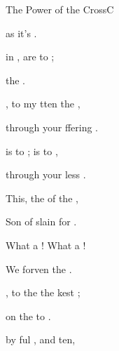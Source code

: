 \documentclass[12pt]{book}
\begin{document}
\begin{song}{The Power of the Cross}{C}
\begin{SBVerse}
         as it's 
              .

          in , 
             are  to ;

         the  .

    \end{SBVerse}

    \begin{SBVerse}
        
        , to  my  
            tten  the , 

         through your ffering 
              .

         is  to ;
             is  to ,

         through your less .

    \end{SBVerse}

    \begin{SBChorus}

        This, the  of the ,

        Son of  slain for .

        What a ! What a !

        We  forven  the . 
            \Ch{[Am}{}  \Ch{C]}{}

    \end{SBChorus}

\begin{SBExtraKeys}{
    \CBPageBrk

    \Ch{Intro: [Em}{}  \Ch{G]x2}{}
    \begin{SBVerse}
        
        , to  the  
             the kest ; 

         on the  to 
            .

         by ful , 
             and ten, 


\end{SBVerse}}
\end{SBExtraKeys}
\end{song}
\end{document}
